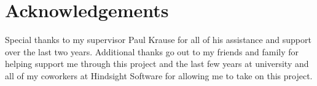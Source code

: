 
\chapter*{Acknowledgements}

Special thanks to my supervisor Paul Krause for all of his assistance and support over the last two years. Additional thanks go out to my friends and family for helping support me through this project and the last few years at university and all of my coworkers at Hindsight Software for allowing me to take on this project.
